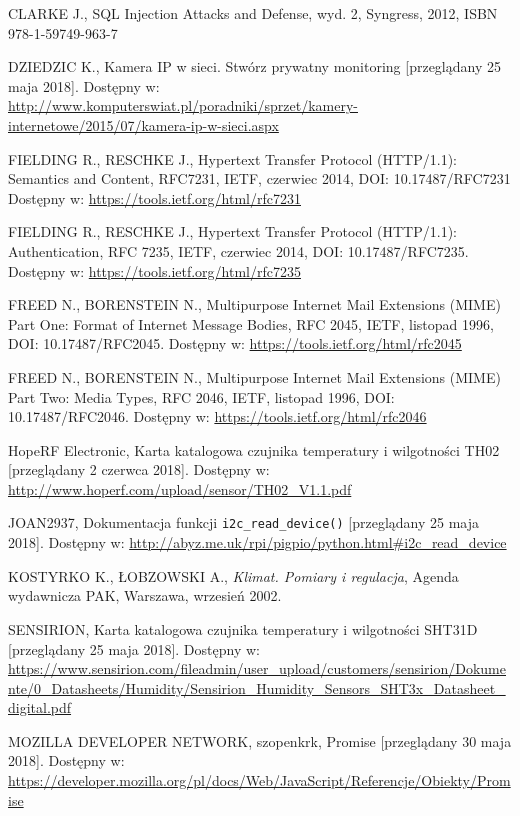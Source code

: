 \documentclass[a4paper,11pt,twoside]{article}
\begin{document}
\begin{thebibliography}{9}
\uppercase{Clarke J.}, SQL Injection Attacks and Defense, wyd. 2, Syngress, 2012, ISBN 978-1-59749-963-7  

\uppercase{Dziedzic K.}, Kamera IP w sieci. Stwórz prywatny monitoring [przeglądany 25 maja 2018].
Dostępny w: \url{http://www.komputerswiat.pl/poradniki/sprzet/kamery-internetowe/2015/07/kamera-ip-w-sieci.aspx}

\uppercase{Fielding R., Reschke J.}, Hypertext Transfer Protocol (HTTP/1.1): Semantics and Content, RFC7231, IETF, czerwiec 2014, DOI: 10.17487/RFC7231
Dostępny w: \url{https://tools.ietf.org/html/rfc7231}

\uppercase{Fielding R., Reschke J.}, Hypertext Transfer Protocol (HTTP/1.1): Authentication, RFC 7235, IETF, czerwiec 2014, DOI: 10.17487/RFC7235.
Dostępny w: \url{https://tools.ietf.org/html/rfc7235}

\uppercase{Freed N., Borenstein N.}, Multipurpose Internet Mail Extensions (MIME) Part One: Format of Internet Message Bodies, RFC 2045, IETF, listopad 1996, DOI: 10.17487/RFC2045.
Dostępny w: \url{https://tools.ietf.org/html/rfc2045}

\uppercase{Freed N., Borenstein N.}, Multipurpose Internet Mail Extensions (MIME) Part Two: Media Types, RFC 2046, IETF, listopad 1996, DOI: 10.17487/RFC2046.
Dostępny w: \url{https://tools.ietf.org/html/rfc2046}

HopeRF Electronic, Karta katalogowa czujnika temperatury i wilgotności TH02 [przeglądany 2 czerwca 2018].
Dostępny w: \url{http://www.hoperf.com/upload/sensor/TH02_V1.1.pdf}

\uppercase{joan2937}, Dokumentacja funkcji \texttt{i2c{\_}read{\_}device()} [przeglądany 25 maja 2018].
Dostępny w: \url{http://abyz.me.uk/rpi/pigpio/python.html#i2c_read_device}

\uppercase{Kostyrko K., Łobzowski A.}, \textit{Klimat. Pomiary i regulacja}, Agenda wydawnicza PAK, Warszawa, wrzesień 2002.

\uppercase{Sensirion}, Karta katalogowa czujnika temperatury i wilgotności SHT31D [przeglądany 25 maja 2018].
Dostępny w: \url{https://www.sensirion.com/fileadmin/user_upload/customers/sensirion/Dokumente/0_Datasheets/Humidity/Sensirion_Humidity_Sensors_SHT3x_Datasheet_digital.pdf}

\uppercase{Mozilla Developer Network}, szopenkrk, Promise [przeglądany 30 maja 2018].
Dostępny w: \url{https://developer.mozilla.org/pl/docs/Web/JavaScript/Referencje/Obiekty/Promise}


\end{thebibliography}
\end{document}
